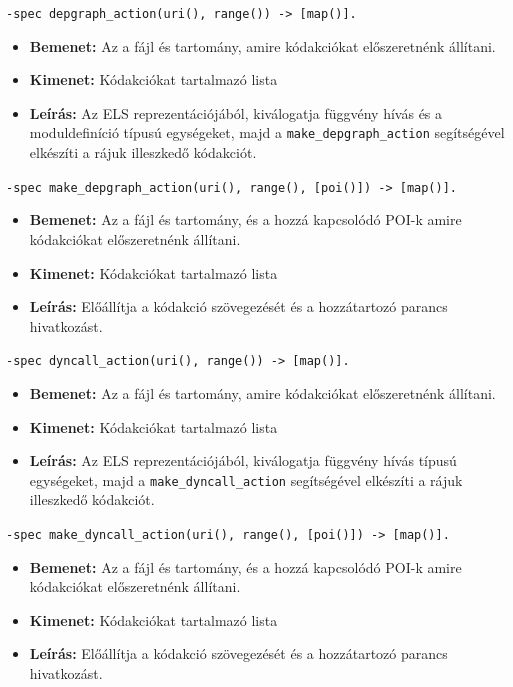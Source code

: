     
    
\noindent  \lstinline{-spec depgraph_action(uri(), range()) -> [map()].}
    \begin{itemize}
        \item \textbf{Bemenet:} Az a fájl és tartomány, amire kódakciókat előszeretnénk állítani.
        \item \textbf{Kimenet:} Kódakciókat tartalmazó lista
        \item \textbf{Leírás:} Az ELS reprezentációjából, kiválogatja függvény hívás és a moduldefiníció típusú egységeket, majd a \lstinline{make_depgraph_action} segítségével elkészíti a rájuk illeszkedő kódakciót.
    \end{itemize}
    
    
    
\noindent  \lstinline{-spec make_depgraph_action(uri(), range(), [poi()]) -> [map()].}
    \begin{itemize}
        \item \textbf{Bemenet:} Az a fájl és tartomány, és a hozzá kapcsolódó POI-k amire kódakciókat előszeretnénk állítani.
        \item \textbf{Kimenet:} Kódakciókat tartalmazó lista
        \item \textbf{Leírás:} Előállítja a kódakció szövegezését és a hozzátartozó parancs hivatkozást.
    \end{itemize}
    
    
    
\noindent \lstinline{-spec dyncall_action(uri(), range()) -> [map()].}
    \begin{itemize}
        \item \textbf{Bemenet:} Az a fájl és tartomány, amire kódakciókat előszeretnénk állítani.
        \item \textbf{Kimenet:} Kódakciókat tartalmazó lista
        \item \textbf{Leírás:} Az ELS reprezentációjából, kiválogatja függvény hívás típusú egységeket, majd a \lstinline{make_dyncall_action} segítségével elkészíti a rájuk illeszkedő kódakciót.
    \end{itemize}
    
\noindent   \lstinline{-spec make_dyncall_action(uri(), range(), [poi()]) -> [map()].}
    \begin{itemize}
        \item \textbf{Bemenet:} Az a fájl és tartomány, és a hozzá kapcsolódó POI-k amire kódakciókat előszeretnénk állítani.
        \item \textbf{Kimenet:} Kódakciókat tartalmazó lista
        \item \textbf{Leírás:} Előállítja a kódakció szövegezését és a hozzátartozó parancs hivatkozást.
    \end{itemize}



